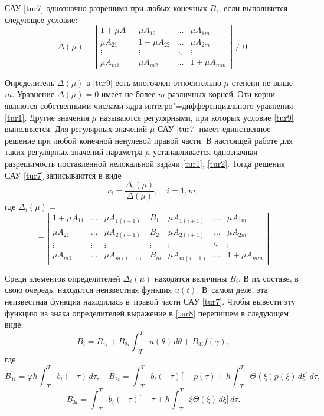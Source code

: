 САУ \eqref{tur7} однозначно разрешима при любых конечных $B_{i} $,  если выполняется следующее условие:
\begin {equation}\label{tur9}
\Delta (\mu)=\left| \begin{array}{cccc}
1+\mu  A_{11} & \mu  A_{12}& \ldots & \mu  A_{1 m}\\
\mu  A_{21} & 1+\mu  A_{22} &  \ldots & \mu  A_{2 m} \\
\vdots &  \vdots &  \ddots & \vdots \\
\mu  A_{m 1} & \mu  A_{m 2} &   \ldots  & 1+\mu  A_{m m}
\end{array} \right| \ne 0 .
\end{equation}

Определитель $\Delta (\mu)$ в \eqref{tur9} есть многочлен относительно $\mu$ степени не выше $m$. 
Уравнение $\Delta (\mu)=0$ имеет не более $m$ различных корней. 
Эти корни являются собственными числами ядра интегро"=дифференциального уравнения \eqref{tur1}.  
Другие значения $\mu$ называются регулярными, при которых условие \eqref{tur9} выполняется. 
Для регулярных значений $\mu$ САУ \eqref{tur7} имеет единственное решение при любой конечной ненулевой правой части. 
В настоящей работе для таких регулярных значений параметра $\mu$  устанавливается однозначная разрешимость поставленной нелокальной задачи \eqref{tur1}, \eqref{tur2}. 
Тогда решения САУ  \eqref{tur7} записываются в виде
\begin {equation}\label{tur10}
c_{i}=\frac{\Delta_{i}(\mu)}{\Delta (\mu )} , \quad i=\overline{1 , m} , 
\end{equation}
где 
$
\Delta_{i} (\mu)=
$
$$
=\left| \begin{array}{ccccccc}
1+\mu  A_{11} & \ldots & \mu  A_{1 (i-1)} & B_{1}  & \mu  A_{1 (i+1)} & \ldots & \mu  A_{1 m}\\
\mu  A_{21} & \ldots & \mu  A_{2 (i-1)}  & B_{2}  & \mu  A_{2 (i+1)} &  \ldots & \mu  A_{2 m} \\
\vdots &  \vdots & \vdots & \vdots & \vdots &  \ddots & \vdots \\
\mu  A_{m 1} & \ldots & \mu  A_{m (i-1)} & B_{ m}  & \mu  A_{m (i+1)} & \ldots  & 1+\mu  A_{m m}
\end{array} \right|. 
$$

Среди элементов определителей $\Delta_{i} (\mu)$ находятся величины $B_{i} $.  В их составе, в свою очередь,  находится неизвестная функция $u (t)$. 
В~самом деле, эта неизвестная функция находилась в~правой части САУ \eqref{tur7}. 
Чтобы вывести эту функцию из знака определителей выражение в \eqref{tur8} перепишем в следующем виде:
$$
B_{i}=B_{ 1 i}+B_{ 2 i}  \int _{-T}^T u (\theta) \, d \theta+B_{ 3 i}   f (\gamma) ,
$$
где 
$$
B_{ 1 i}=\varphi  h  \int _{-T}^T b_{i} (-\tau) \, d \tau , \quad
B_{ 2 i}=  \int _{-T}^T b_{i} (-\tau) \biggl[ -p (\tau)+h  \int _{-T}^T \Theta (\xi) p (\xi) \, d \xi \biggr] \, d \tau , 
$$
$$
B_{3 i}=  \int _{-T}^T b_{i} (-\tau) \biggl[ -\tau+h   \int _{-T}^T \xi  \Theta (\xi) \, d \xi \biggr] \, d \tau .
$$
	
